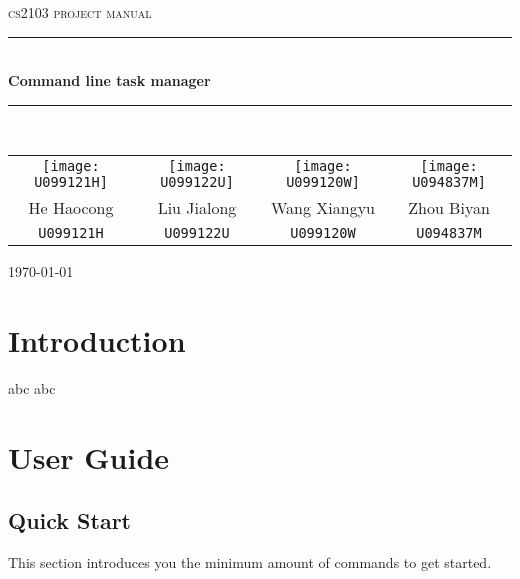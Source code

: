 \documentclass[12pt, a4paper]{article}
\begin{document}
\begin{titlepage}
  \centering

  \textsc{\LARGE cs2103 project manual}
  \\[1.5cm]
  \hrule
  \\[0.5cm]
  \Large \bfseries Command line task manager
  \\[0.4cm]
  \hrule
  \\[1.5cm]

  \begin{tabular}{c | c | c | c}
    \texttt{[image: U099121H]}&
    \texttt{[image: U099122U]}&
    \texttt{[image: U099120W]}&
    \texttt{[image: U094837M]}\\

    \small{He Haocong} & \small{Liu Jialong} & \small{Wang Xiangyu} & \small{Zhou Biyan} \\
    \small{\texttt{U099121H}} & \small{\texttt{U099122U}} & \small{\texttt{U099120W}} & \small{\texttt{U094837M}} \\

  \end{tabular}

  \vfill
  {\large \today}
\end{titlepage}


\tableofcontents

\newpage

\section{Introduction}
abc abc

\section{User Guide}
\subsection{Quick Start}

This section introduces you the minimum amount of commands to get started.
\end{document}
